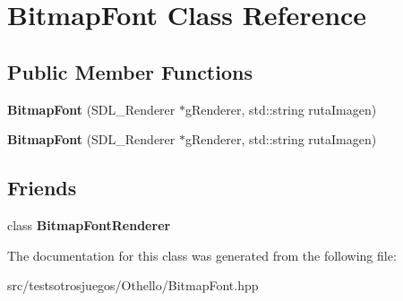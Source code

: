 \hypertarget{class_bitmap_font}{}\section{Bitmap\+Font Class Reference}
\label{class_bitmap_font}
\subsection*{Public Member Functions}
\begin{DoxyCompactItemize}
\item 
{\bfseries Bitmap\+Font} (S\+D\+L\+\_\+\+Renderer $\ast$g\+Renderer, std\+::string ruta\+Imagen)\hypertarget{class_bitmap_font_a857c5fdf52ae5a93bc242ce98153b926}{}\label{class_bitmap_font_a857c5fdf52ae5a93bc242ce98153b926}

\item 
{\bfseries Bitmap\+Font} (S\+D\+L\+\_\+\+Renderer $\ast$g\+Renderer, std\+::string ruta\+Imagen)\hypertarget{class_bitmap_font_a857c5fdf52ae5a93bc242ce98153b926}{}\label{class_bitmap_font_a857c5fdf52ae5a93bc242ce98153b926}

\end{DoxyCompactItemize}
\subsection*{Friends}
\begin{DoxyCompactItemize}
\item 
class {\bfseries Bitmap\+Font\+Renderer}\hypertarget{class_bitmap_font_ada37f4b07dc117410a58a68940f82e46}{}\label{class_bitmap_font_ada37f4b07dc117410a58a68940f82e46}

\end{DoxyCompactItemize}


The documentation for this class was generated from the following file\+:\begin{DoxyCompactItemize}
\item 
src/testsotrosjuegos/\+Othello/Bitmap\+Font.\+hpp\end{DoxyCompactItemize}
